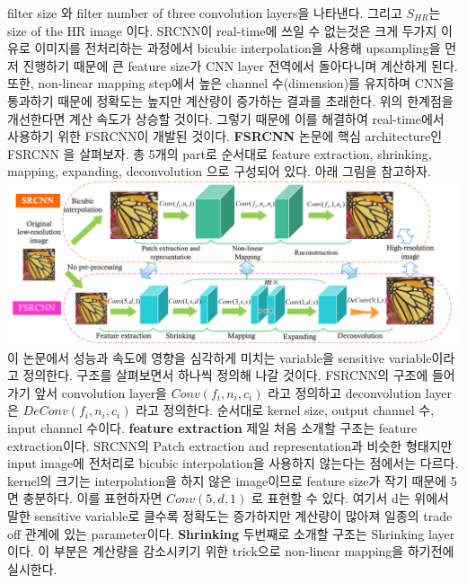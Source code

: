 \documentclass[extendedabs]{bmvc2k}
\begin{document}
 filter size 와 filter number of three convolution layers을 나타낸다. 그리고 $S_{HR}$는 size of the HR image 이다.      
 \newline SRCNN이 real-time에 쓰일 수 없는것은 크게 두가지 이유로
 이미지를 전처리하는 과정에서 bicubic interpolation을 사용해 upsampling을 먼저 진행하기 때문에 큰 feature size가 CNN layer 전역에서 돌아다니며 계산하게 된다.
 또한, non-linear mapping step에서 높은 channel 수(dimension)를 유지하며 CNN을 통과하기 때문에 정확도는 높지만 계산량이 증가하는 결과를 초래한다.
 \newline 위의 한계점을 개선한다면 계산 속도가 상승할 것이다. 그렇기 때문에 이를 해결하여 real-time에서 사용하기 위한 FSRCNN이 개발된 것이다.
 \newline \quad \textbf{FSRCNN} 논문에 핵심 architecture인 FSRCNN \cite{dong2016accelerating}을 살펴보자. 총 5개의 part로 순서대로 feature extraction, shrinking, mapping,
 expanding, deconvolution 으로 구성되어 있다. 아래 그림을 참고하자.
 \newline  \includegraphics[width=\linewidth]{images/02_SR.PNG}
 이 논문에서 성능과 속도에 영향을 심각하게 미치는 variable을 sensitive variable이라고 정의한다. 구조를 살펴보면서 하나씩 정의해 나갈 것이다.
 FSRCNN의 구조에 들어가기 앞서 convolution layer을 $Conv(f_i,n_i,c_i)$ 라고 정의하고 deconvolution layer은 $DeConv(f_i,n_i,c_i)$ 라고 정의한다. 
 순서대로 kernel size, output channel 수, input channel 수이다. 
 \newline \quad \textbf{feature extraction} 제일 처음 소개할 구조는 feature extraction이다. SRCNN의 Patch extraction and representation과 비슷한
 형태지만 input image에 전처리로 bicubic interpolation을 사용하지 않는다는 점에서는 다르다. kernel의 크기는 interpolation을 하지 않은 image이므로 feature size가 작기 때문에 5면 충분하다. 이를 표현하자면 
 $Conv(5,d,1)$ 로 표현할 수 있다. 
 여기서 d는 위에서말한 sensitive variable로 클수록 정확도는 증가하지만 계산량이 많아져 일종의 trade off 관계에 있는 parameter이다.
 \newline \quad \textbf{Shrinking} 두번째로 소개할 구조는 Shrinking layer이다. 이 부분은 계산량을 감소시키기 위한 trick으로 non-linear mapping을 하기전에 실시한다.
\end{document}
